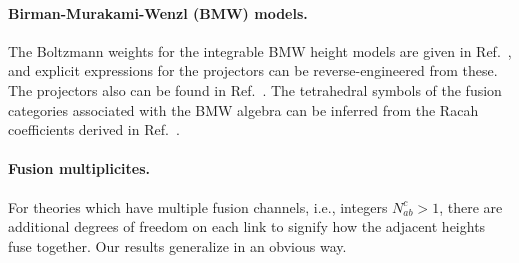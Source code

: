 \paragraph{Birman-Murakami-Wenzl (BMW) models. }
The Boltzmann weights for the integrable BMW height models are given in Ref.~\cite{Jimbo:1987}, and explicit expressions for the projectors can be reverse-engineered from these.
The projectors also can be found in Ref.~\cite{Reshetikhin1988b}.
The tetrahedral symbols of the fusion categories associated with the BMW algebra can be inferred from the Racah coefficients derived in Ref.~\cite{Dai2001}.

\paragraph{Fusion multiplicites.}

For theories which have multiple fusion channels, i.e., integers $N_{ab}^c>1$, there are additional degrees of freedom on each link to signify how the adjacent heights fuse together. 
Our results generalize in an obvious way.


